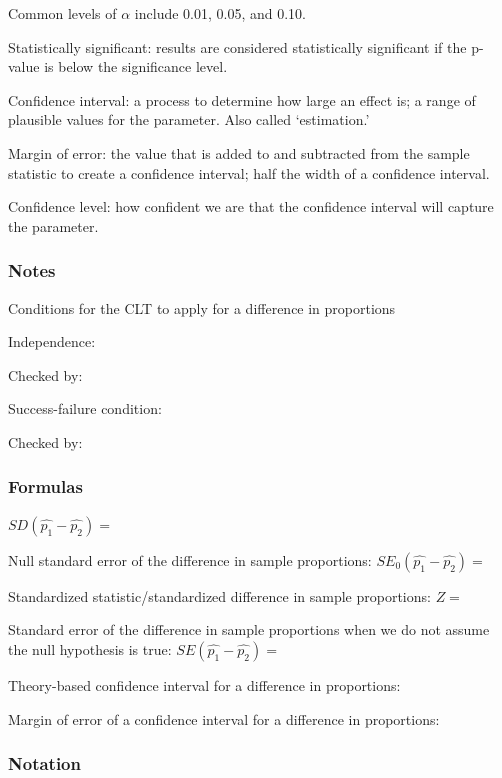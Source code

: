 \documentclass[
]{report}
\newcommand{\rgs}{\vspace{12pt}} %
\newcommand{\rgi}{\hspace{24pt}}  %
\begin{document}
\rgi Common levels of \(\alpha\) include 0.01, 0.05, and 0.10.

Statistically significant: results are considered statistically significant if the p-value is below the significance level.

Confidence interval: a process to determine how large an effect is; a range of plausible values for the parameter. Also called `estimation.'

Margin of error: the value that is added to and subtracted from the sample statistic to create a confidence interval; half the width of a confidence interval.

Confidence level: how confident we are that the confidence interval will capture the parameter.

\hypertarget{notes-21}{%
\subsubsection*{Notes}\label{notes-21}}

Conditions for the CLT to apply for a difference in proportions

\rgi Independence:
\rgs

\rgi \rgi Checked by:
\rgs

\rgi Success-failure condition:
\rgs

\rgi \rgi Checked by:
\rgs

\hypertarget{formulas-4}{%
\subsubsection*{Formulas}\label{formulas-4}}

\(SD(\hat{p_1} - \hat{p_2})=\)
\rgs

Null standard error of the difference in sample proportions:
\(SE_0(\hat{p_1} - \hat{p_2})=\)
\rgs

Standardized statistic/standardized difference in sample proportions:
\(Z=\)
\rgs

Standard error of the difference in sample proportions when we do not assume the null hypothesis is true:
\(SE(\hat{p_1} - \hat{p_2})=\)
\rgs

Theory-based confidence interval for a difference in proportions:
\rgs

Margin of error of a confidence interval for a difference in proportions:
\rgs

\hypertarget{notation-1}{%
\subsubsection*{Notation}\label{notation-1}}
\end{document}
